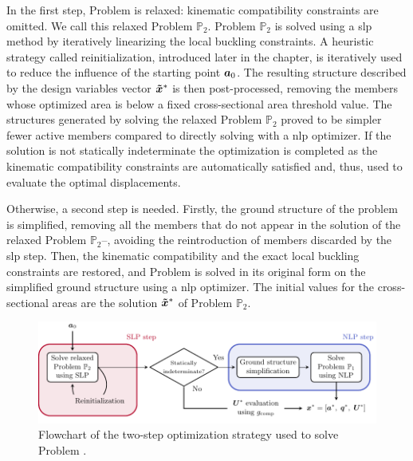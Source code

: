 In the first step, Problem  is relaxed: kinematic compatibility constraints are omitted. We call this relaxed Problem $\mathbb{P}_2$. Problem $\mathbb{P}_2$ is solved using a \gls{slp} method by iteratively linearizing the local buckling constraints. A heuristic strategy called reinitialization, introduced later in the chapter, is iteratively used to reduce the influence of the starting point $\bm{a}_0$. The resulting structure described by the design variables vector $\bm{\tilde{x}}^*$ is then post-processed, removing the members whose optimized area is below a fixed cross-sectional area threshold value. The structures generated by solving the relaxed Problem $\mathbb{P}_2$ proved to be simpler \ie fewer active members compared to directly solving  with a \gls{nlp} optimizer. If the solution is not statically indeterminate the optimization is completed as the kinematic compatibility constraints  are automatically satisfied and, thus, used to evaluate the optimal displacements.

Otherwise, a second step is needed. Firstly, the ground structure of the problem is simplified, removing all the members that do not appear in the solution of the relaxed Problem $\mathbb{P}_2$--\ie, avoiding the reintroduction of members discarded by the \gls{slp} step. Then, the kinematic compatibility and the exact local buckling constraints are restored, and Problem  is solved in its original form on the simplified ground structure using a \gls{nlp} optimizer. The initial values for the cross-sectional areas are the solution $\bm{\tilde{x}}^*$ of Problem $\mathbb{P}_2$.

\begin{figure}
    \centering
    \includegraphics[width=\linewidth]{figures/04_TTO_improvements/02_solution_algo/sol_algo.pdf}
    \caption{Flowchart of the two-step optimization strategy used to solve Problem .}
    \label{fig:04_sol_alg}
\end{figure}

